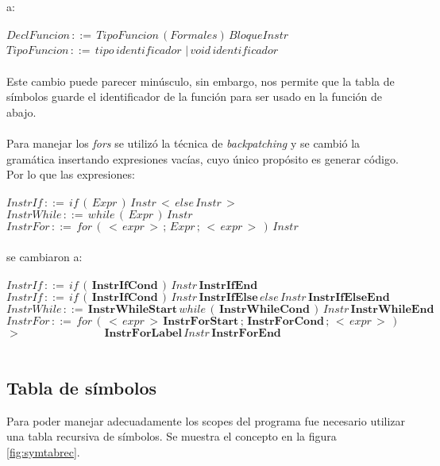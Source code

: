 \documentclass[11pt]{article}
\begin{document}
\\\\
a:
\\\\
$DeclFuncion\,::=\,TipoFuncion\,(Formales)\,BloqueInstr$
\\
$TipoFuncion\,::=\,tipo\,identificador$
$|\,void\,identificador$
\\\\
Este cambio puede parecer minúsculo, sin embargo, nos permite que la tabla de símbolos guarde el identificador de la función para ser usado en la función de abajo.
\\\\
Para manejar los \textit{fors} se utilizó la técnica de \textit{backpatching} y se cambió la gramática insertando expresiones vacías, cuyo único propósito es generar código. Por lo que las expresiones:
\\\\
$InstrIf\,::=\,if\,(\,Expr\,)\,Instr\,<\,else\,Instr\,>$
\\
$InstrWhile\,::=\,while\,(\,Expr\,)\,Instr$
\\
$InstrFor\,::=\,for\,(\,<\,expr\,>\,;\,Expr\,;\,<\,expr\,>\,)\,Instr$
\\\\
se cambiaron a:
\\\\
$InstrIf\,::=\,if\,(\,\mathbf{InstrIfCond}\,)\,Instr\,\mathbf{InstrIfEnd}$
\\
$InstrIf\,::=\,if\,(\,\mathbf{InstrIfCond}\,)\,Instr\,\mathbf{InstrIfElse}\,else\,Instr\,\mathbf{InstrIfElseEnd}$
\\
$InstrWhile\,::=\,\mathbf{InstrWhileStart}\,while\,(\,\mathbf{InstrWhileCond}\,)\,Instr\,\mathbf{InstrWhileEnd}$
\\
$InstrFor\,::=\,for\,(\,<\,expr\,>\,\mathbf{InstrForStart}\,;\,\mathbf{InstrForCond}\,;\,<\,expr\,>\,)$
\\
$>\,\,\,\,\,\,\,\,\,\,\,\,\,\,\,\,\,\,\,\,\,\,\,\,\,\,\,\,\,\,\,\,\,\,\,\,\,\,\,\,\,\,\,\,\,\mathbf{InstrForLabel}\,Instr\,\mathbf{InstrForEnd}$
\\\\

\subsection{Tabla de símbolos}

Para poder manejar adecuadamente los scopes del programa fue necesario utilizar una tabla recursiva de símbolos. Se muestra el 
concepto en la figura \ref{fig:symtabrec}.
\end{document}

